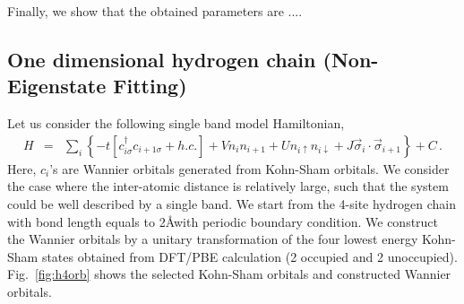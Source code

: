 \documentclass[prl,12pt,onecolumn,nofootinbib,notitlepage,english,superscriptaddress]{revtex4-1}
\begin{document}
 
Finally, we show that the obtained parameters are ....


\subsection{One dimensional hydrogen chain (Non-Eigenstate Fitting)}
Let us consider the following single band model Hamiltonian,
\begin{eqnarray}\label{eq:h4model}
H &=& \sum_{i}\left\{-t[c^{\dagger}_{i\sigma}c_{i+1\sigma} +h.c.]+ Vn_{i}n_{i+1} + Un_{i\uparrow}n_{i\downarrow}+ J\vec \sigma_{i}\cdot \vec \sigma_{i+1}\right\} + C\,.
\end{eqnarray}
Here, $c_{i}$'s are Wannier orbitals generated from Kohn-Sham orbitals. We consider the case where the inter-atomic distance is relatively large, such that the system could be well described by a single band.  We start from the 4-site hydrogen chain with bond length equals to 2\AA with periodic boundary condition. We construct the Wannier orbitals by a unitary transformation of the four lowest energy Kohn-Sham states obtained from DFT/PBE calculation (2 occupied and 2 unoccupied). Fig.~\ref{fig:h4orb} shows the selected Kohn-Sham orbitals and constructed Wannier orbitals. 
\end{document}

